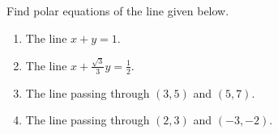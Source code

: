 Find polar equations of the line given below.

\begin{enumerate}
\item The line $x+y=1$.
\item The line $ x+\frac{\sqrt{3}}{3}y=\frac{1}{2}$.
\item The line passing through $(3,5)$ and $(5,7)$.
\item The line passing through $(2,3)$ and $(-3,-2)$.
\end{enumerate}